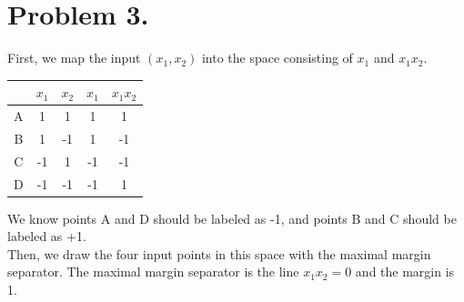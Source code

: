 \documentclass{article}
\begin{document}
    \newpage
    \section*{Problem 3.}
    First, we map the input $(x_1, x_2)$ into the space consisting of $x_1$ and $x_1x_2$.
    \begin{center}
        \begin{tabular}{|c|c|c|c|c|}
            \hline
            & $x_1$ & $x_2$ & $x_1$ & $x_1x_2$\\
            \hline
            A & 1 & 1 & 1 & 1\\
            \hline
            B & 1 & -1 & 1 & -1\\
            \hline
            C & -1 & 1 & -1 & -1\\
            \hline
            D & -1 & -1 & -1 & 1\\
            \hline
        \end{tabular}
    \end{center}
    We know points A and D should be labeled as -1, and points B and C should be labeled as +1.\\
    Then, we draw the four input points in this space with the maximal margin separator. The maximal margin 
    separator is the line $x_1x_2 = 0$ and the margin is 1.
    \begin{center}
    \end{center}
\end{document}
